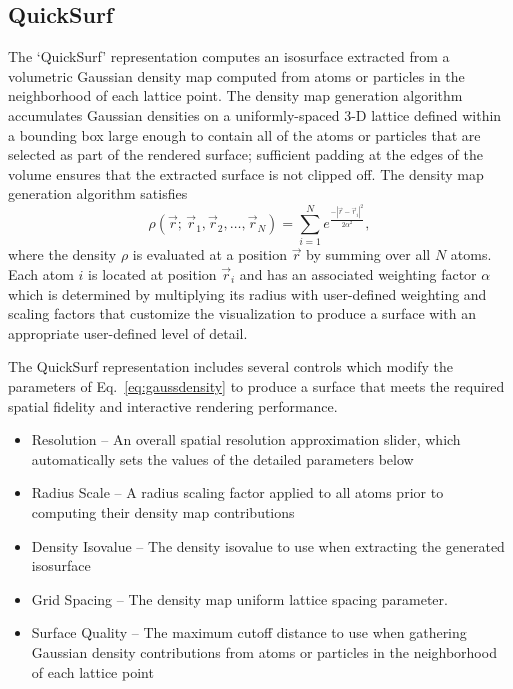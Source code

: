 \subsection{QuickSurf}
\label{ug:topic:drawmethods:quicksurf}
The `QuickSurf' representation computes an isosurface extracted from a 
volumetric Gaussian density map computed from atoms or particles in the
neighborhood of each lattice point.
The density map generation algorithm accumulates Gaussian densities on a
uniformly-spaced 3-D lattice defined within a bounding box
large enough to contain all of the atoms or particles that are selected
as part of the rendered surface; sufficient padding at the edges
of the volume ensures that the extracted surface is not clipped off.
The density map generation algorithm satisfies
\begin{equation}
\rho(\vec{r};\,\vec{r}_1,\vec{r}_2,\dots,\vec{r}_N)
= \sum_{i=1}^{N} e^\frac{-|\vec{r}-\vec{r}_{i}|^2}{2 \alpha^2},
\label{eq:gaussdensity}
\end{equation}
where the density $\rho$ is evaluated at a position $\vec{r}$ by summing
over all $N$ atoms. Each atom $i$ is located at position $\vec{r}_i$ and
has an associated weighting factor $\alpha$ which is determined by
multiplying its radius with user-defined weighting and scaling factors
that customize the visualization to produce a surface with an
appropriate user-defined level of detail.

The QuickSurf representation includes several controls which modify 
the parameters of Eq.~\ref{eq:gaussdensity} to produce a surface that
meets the required spatial fidelity and interactive rendering performance.

\begin{itemize}
\item Resolution -- An overall spatial resolution approximation slider, which
      automatically sets the values of the detailed parameters below
\item Radius Scale -- A radius scaling factor applied to all atoms prior to 
      computing their density map contributions
\item Density Isovalue -- The density isovalue to use when extracting the
      generated isosurface
\item Grid Spacing -- The density map uniform lattice spacing parameter.
\item Surface Quality -- The maximum cutoff distance to use when gathering
      Gaussian density contributions from atoms or particles in the 
      neighborhood of each lattice point
\end{itemize}

